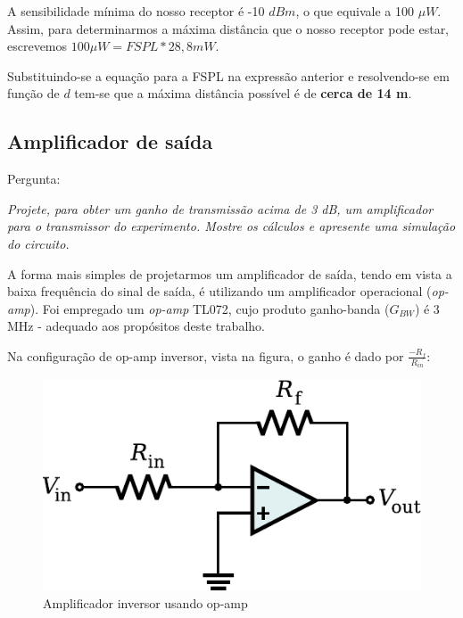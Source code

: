 \documentclass[]{report}
\begin{document}
A sensibilidade mínima do nosso receptor é -10 $dBm$, o que equivale a 100 $\mu W$. Assim, para determinarmos a máxima distância que o nosso receptor pode estar, escrevemos $100 \mu W = FSPL * 28,8 mW$.

Substituindo-se a equação para a FSPL na expressão anterior e resolvendo-se em função de $d$ tem-se que a máxima distância possível é de \textbf{cerca de 14 m}.

\subsection{Amplificador de saída}

Pergunta:

\begin{flushright}
\textit{Projete, para obter um ganho de transmissão acima de 3 dB, um amplificador para o transmissor do experimento. Mostre os cálculos e apresente uma simulação do circuito.}
\end{flushright}

A forma mais simples de projetarmos um amplificador de saída, tendo em vista a baixa frequência do sinal de saída, é utilizando um amplificador operacional (\textit{op-amp}). Foi empregado um \textit{op-amp} TL072, cujo produto ganho-banda ($G_{BW}$) é 3 MHz - adequado aos propósitos deste trabalho.

Na configuração de op-amp inversor, vista na figura, o ganho é dado por $\frac{-R_{f}}{R_{in}}$:

\begin{figure}[H]
\begin{center}
\includegraphics[scale=0.65]{./imagens/Op-Amp_Inverting_Amplifier}
\end{center}
\caption{Amplificador inversor usando op-amp}
\label{fig:opamp}
\end{figure}
\end{document}
